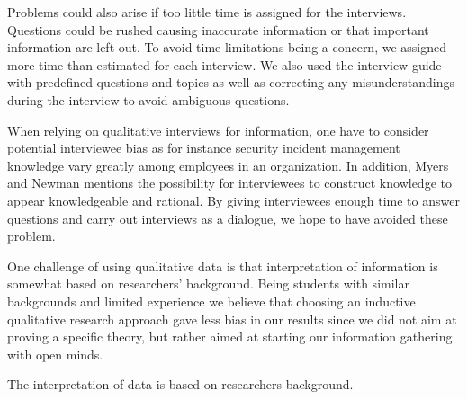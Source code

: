 Problems could also arise if too little time is assigned for the interviews. Questions could be rushed causing inaccurate information or that important information are left out. To avoid time limitations being a concern, we assigned more time than estimated for each interview. We also used the interview guide with predefined questions and topics as well as correcting any misunderstandings during the interview to avoid ambiguous questions.

When relying on qualitative interviews for information, one have to consider potential interviewee bias as for instance security incident management knowledge vary greatly among employees in an organization. In addition, Myers and Newman mentions the possibility for interviewees to construct knowledge to appear knowledgeable and rational. By giving interviewees enough time to answer questions and carry out interviews as a dialogue, we hope to have avoided these problem.

One challenge of using qualitative data is that interpretation of information is somewhat based on researchers' background. Being students with similar backgrounds and limited experience we believe that choosing an inductive qualitative research approach gave less bias in our results since we did not aim at proving a specific theory, but rather aimed at starting our information gathering with open minds. 

The interpretation of data is based on researchers background.


